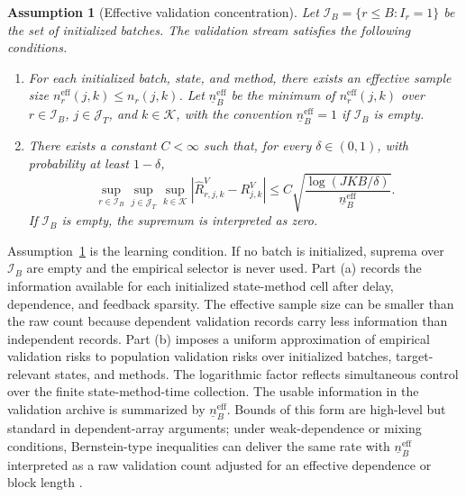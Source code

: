 \documentclass[a4paper, 12pt]{article}
\theoremstyle{plain}
\newtheorem{assumption}{Assumption}
\theoremstyle{remark}
\newcommand{\Kcal}{\mathcal{K}}
\newcommand{\1}{\mathbf{1}}
\begin{document}
\begin{assumption}[Effective validation concentration]
\label{ass:effective-concentration}
Let \(\mathcal I_B=\{r\leq B:I_r=1\}\) be the set of initialized batches. The validation stream satisfies the following conditions.
\begin{enumerate}[label=(\alph*), leftmargin=*]
    \item For each initialized batch, state, and method, there exists an effective sample size \(n^{\mathrm{eff}}_r(j,k)\leq n_r(j,k)\). Let \(\underline n^{\mathrm{eff}}_B\) be the minimum of \(n^{\mathrm{eff}}_r(j,k)\) over \(r\in\mathcal I_B\), \(j\in\mathcal J_T\), and \(k\in\Kcal\), with the convention \(\underline n^{\mathrm{eff}}_B=1\) if \(\mathcal I_B\) is empty.
    \item There exists a constant \(C<\infty\) such that, for every \(\delta\in(0,1)\), with probability at least \(1-\delta\),
    \begin{equation}
    \label{eq:effective-concentration}
        \sup_{r\in\mathcal I_B}
        \sup_{j\in\mathcal J_T}
        \sup_{k\in\Kcal}
        \left|\widehat R^V_{r,j,k}-R^V_{j,k}\right|
        \leq
        C
        \sqrt{
        \frac{\log(JKB/\delta)}{\underline n^{\mathrm{eff}}_B}
        } .
    \end{equation}
    If \(\mathcal I_B\) is empty, the supremum is interpreted as zero.
\end{enumerate}
\end{assumption}

Assumption~\ref{ass:effective-concentration} is the learning condition. If no batch is initialized, suprema over \(\mathcal I_B\) are empty and the empirical selector is never used. Part (a) records the information available for each initialized state-method cell after delay, dependence, and feedback sparsity. The effective sample size can be smaller than the raw count because dependent validation records carry less information than independent records. Part (b) imposes a uniform approximation of empirical validation risks to population validation risks over initialized batches, target-relevant states, and methods. The logarithmic factor reflects simultaneous control over the finite state-method-time collection. The usable information in the validation archive is summarized by \(\underline n^{\mathrm{eff}}_B\). Bounds of this form are high-level but standard in dependent-array arguments; under weak-dependence or mixing conditions, Bernstein-type inequalities can deliver the same rate with \(\underline n^{\mathrm{eff}}_B\) interpreted as a raw validation count adjusted for an effective dependence or block length \citep{MerlevedePeligradRio2011}.
\end{document}
